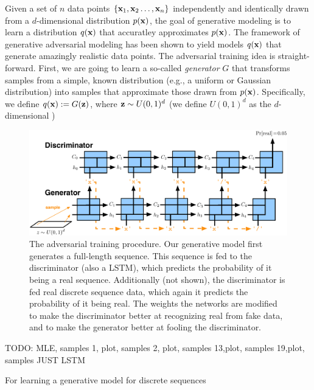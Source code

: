 Given a set of $n$ data points $\{ \mathbf{x}_1, \mathbf{x}_2 \ldots, \mathbf{x}_n\}$ independently and identically drawn from a $d$-dimensional distribution $p(\mathbf{x})$, the goal of generative modeling is to learn a distribution $q(\mathbf{x})$ that accuratley approximates $p(\mathbf{x})$. The framework of generative adversarial modeling has been shown to yield models $q(\mathbf{x})$ that generate amazingly realistic data points. The adversarial training idea is straight-forward. First, we are going to learn a so-called \emph{generator} $G$ that transforms samples from a simple, known distribution (e.g., a uniform or Gaussian distribution) into samples that approximate those drawn from $p(\mathbf{x})$. Specifically, we define $q(\mathbf{x}) := G(\mathbf{z})$, where $\mathbf{z} \sim U(0,1)^d$ (we define $U(0,1)^d$ as the $d$-dimensional )




\begin{figure}[t!]
\begin{center}
\centerline{\includegraphics[width=\textwidth]{GAN.pdf}}
\caption{The adversarial training procedure. Our generative model first generates a full-length sequence. This sequence is fed to the discriminator (also a LSTM), which predicts the probability of it being a real sequence. Additionally (not shown), the discriminator is fed real discrete sequence data, which again it predicts the probability of it being real. The weights the networks are modified to make the discriminator better at recognizing real from fake data, and to make the generator better at fooling the discriminator.}
\label{figure.adversarial}
\end{center}
\end{figure}


TODO:
MLE, samples
1, plot, samples
2, plot, samples
13,plot, samples
19,plot, samples
JUST LSTM


For learning a generative model for discrete sequences


